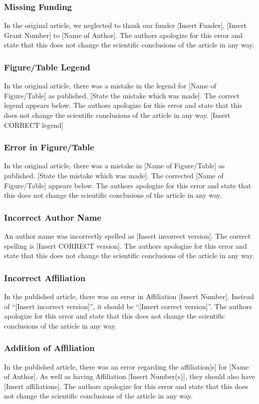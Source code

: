 \documentclass[utf8]{frontiers_correction}
\begin{document}
\subsubsection*{Missing Funding}
In the original article, we neglected to thank our funder [Insert Funder], [Insert Grant Number] to [Name of Author]. The authors apologize for this error and state that this does not change the scientific conclusions of the article in any way.

\subsubsection*{Figure/Table Legend}
In the original article, there was a mistake in the legend for [Name of Figure/Table] as published. [State the mistake which was made]. The correct legend appears below. The authors apologize for this error and state that this does not change the scientific conclusions of the article in any way.
[Insert CORRECT legend]

\subsubsection*{Error in Figure/Table}
In the original article, there was a mistake in [Name of Figure/Table] as published. [State the mistake which was made]. The corrected [Name of Figure/Table] appears below. The authors apologize for this error and state that this does not change the scientific conclusions of the article in any way.

\subsubsection*{Incorrect Author Name}
An author name was incorrectly spelled as [Insert incorrect version]. The correct spelling is [Insert CORRECT version]. The authors apologize for this error and state that this does not change the scientific conclusions of the article in any way.

\subsubsection*{Incorrect Affiliation}
In the published article, there was an error in Affiliation [Insert Number]. Instead of “[Insert incorrect version]”, it should be “[Insert correct version]”. The authors apologize for this error and state that this does not change the scientific conclusions of the article in any way.

\subsubsection*{Addition of Affiliation}
In the published article, there was an error regarding the affiliation[s] for [Name of Author]. As well as having Affiliation [Insert Number(s)], they should also have [Insert affiliations]. The authors apologize for this error and state that this does not change the scientific conclusions of the article in any way.
\end{document}
